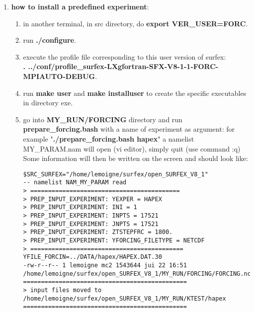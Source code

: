 \begin{enumerate}
	\item {\bf{how to install a predefined experiment}}:
		\begin{enumerate}
			\item in another terminal, in src directory, do {\bf{export VER\_USER=FORC}}.
			\item run {\bf{./configure}}.
			\item execute the profile file corresponding to this user version of surfex: \\
				{\bf{. ../conf/profile\_surfex-LXgfortran-SFX-V8-1-1-FORC-MPIAUTO-DEBUG}}.
			\item run {\bf{make user}} and {\bf{make installuser}} to create the specific executables in directory
exe.
			\item go into {\bf{MY\_RUN/FORCING}} directory and run {\bf{prepare\_forcing.bash}} with a name
				of experiment as argument: for example "{\bf{./prepare\_forcing.bash hapex}}"
a namelist MY\_PARAM.nam will open (vi editor), simply quit (use command :q)
Some information will then be written on the screen and should look like:
				\begin{verbatim}
$SRC_SURFEX="/home/lemoigne/surfex/open_SURFEX_V8_1"
-- namelist NAM_MY_PARAM read
> ==========================================
> PREP_INPUT_EXPERIMENT: YEXPER = HAPEX
> PREP_INPUT_EXPERIMENT: INI = 1
> PREP_INPUT_EXPERIMENT: INPTS = 17521
> PREP_INPUT_EXPERIMENT: JNPTS = 17521
> PREP_INPUT_EXPERIMENT: ZTSTEPFRC = 1800.
> PREP_INPUT_EXPERIMENT: YFORCING_FILETYPE = NETCDF
> ===========================================
YFILE_FORCIN=../DATA/hapex/HAPEX.DAT.30
-rw-r--r-- 1 lemoigne mc2 1543644 jui 22 16:51
/home/lemoigne/surfex/open_SURFEX_V8_1/MY_RUN/FORCING/FORCING.nc
==============================================
> input files moved to
/home/lemoigne/surfex/open_SURFEX_V8_1/MY_RUN/KTEST/hapex
==============================================
				\end{verbatim}


\end{enumerate}
\end{enumerate}
